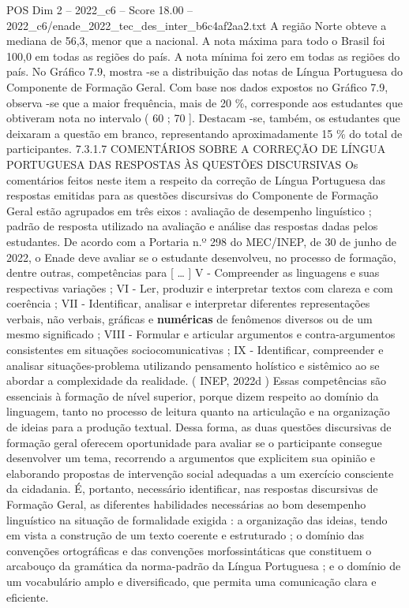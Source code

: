 \begin{textsample}{POS Dim 2 – 2022\_c6 – Score 18.00 – 2022\_c6/enade\_2022\_tec\_des\_inter\_b6c4af2aa2.txt}
A região Norte obteve a mediana de 56,3, menor que a nacional.
A nota máxima para todo o Brasil foi 100,0 em todas as regiões do país.
A nota mínima foi zero em todas as regiões do país.
No Gráfico 7.9, mostra -se a distribuição das notas de Língua Portuguesa do Componente de Formação Geral.
Com base nos dados expostos no Gráfico 7.9, observa -se que a maior frequência, mais de 20 \%, corresponde aos estudantes que obtiveram nota no intervalo ( 60 ; 70 ].
Destacam -se, também, os estudantes que deixaram a questão em branco, representando aproximadamente 15 \% do total de participantes. 7.3.1.7 COMENTÁRIOS SOBRE A CORREÇÃO DE LÍNGUA PORTUGUESA DAS RESPOSTAS ÀS QUESTÕES DISCURSIVAS Os comentários feitos neste item a respeito da correção de Língua Portuguesa das respostas emitidas para as questões discursivas do Componente de Formação Geral estão agrupados em três eixos : avaliação de desempenho linguístico ; padrão de resposta utilizado na avaliação e análise das respostas dadas pelos estudantes.
De acordo com a Portaria n.º 298 do MEC/INEP, de 30 de junho de 2022, o Enade deve avaliar se o estudante desenvolveu, no processo de formação, dentre outras, competências para [ … ] V - Compreender as linguagens e suas respectivas variações ; VI - Ler, produzir e interpretar textos com clareza e com coerência ; VII - Identificar, analisar e interpretar diferentes representações verbais, não verbais, gráficas e \textbf{numéricas} de fenômenos diversos ou de um mesmo significado ; VIII - Formular e articular argumentos e contra-argumentos consistentes em situações sociocomunicativas ; IX - Identificar, compreender e analisar situações-problema utilizando pensamento holístico e sistêmico ao se abordar a complexidade da realidade. ( INEP, 2022d ) Essas competências são essenciais à formação de nível superior, porque dizem respeito ao domínio da linguagem, tanto no processo de leitura quanto na articulação e na organização de ideias para a produção textual.
Dessa forma, as duas questões discursivas de formação geral oferecem oportunidade para avaliar se o participante consegue desenvolver um tema, recorrendo a argumentos que explicitem sua opinião e elaborando propostas de intervenção social adequadas a um exercício consciente da cidadania.
É, portanto, necessário identificar, nas respostas discursivas de Formação Geral, as diferentes habilidades necessárias ao bom desempenho linguístico na situação de formalidade exigida : a organização das ideias, tendo em vista a construção de um texto coerente e estruturado ; o domínio das convenções ortográficas e das convenções morfossintáticas que constituem o arcabouço da gramática da norma-padrão da Língua Portuguesa ; e o domínio de um vocabulário amplo e diversificado, que permita uma comunicação clara e eficiente.

\end{textsample}
